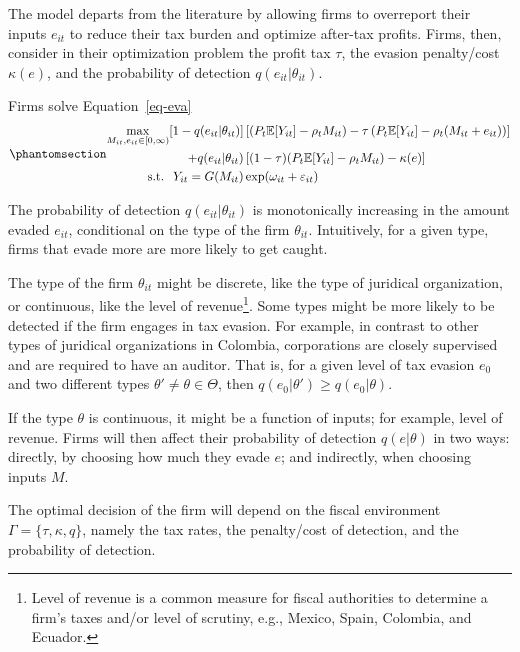 \documentclass[
  12pt]{article}
\theoremstyle{definition}
\theoremstyle{remark}
\begin{document}
The model departs from the literature by allowing firms to overreport
their inputs \(e_{it}\) to reduce their tax burden and optimize
after-tax profits. Firms, then, consider in their optimization problem
the profit tax \(\tau\), the evasion penalty/cost \(\kappa(e)\), and the
probability of detection \(q(e_{it}|\theta_{it})\).

Firms solve Equation~\ref{eq-eva}
\begin{equation}\phantomsection\label{eq-eva}{
\begin{aligned}
  \max_{M_{it}, e_{it}\in [0,\infty)} [1-q(e_{it}|\theta_{it})]&\left[(P_t\mathbb{E}[Y_{it}]-\rho_{t} M_{it})-\tau\left(P_t\mathbb{E}[Y_{it}]-\rho_{t} (M_{it}+e_{it})\right)\right]\\
  +q(e_{it}|\theta_{it})&\left[(1-\tau)(P_t\mathbb{E}[Y_{it}]-\rho_{t} M_{it})-\kappa(e)\right] \\
  \text{s.t. }\; Y_{it}=G(M_{it})&\exp(\omega_{it}+\varepsilon_{it})
\end{aligned}
}\end{equation}

The probability of detection \(q(e_{it}|\theta_{it})\) is monotonically
increasing in the amount evaded \(e_{it}\), conditional on the type of
the firm \(\theta_{it}\). Intuitively, for a given type, firms that
evade more are more likely to get caught.

The type of the firm \(\theta_{it}\) might be discrete, like the type of
juridical organization, or continuous, like the level of
revenue\footnote{Level of revenue is a common measure for fiscal
  authorities to determine a firm's taxes and/or level of scrutiny,
  e.g., Mexico, Spain, Colombia, and Ecuador. }. Some
types might be more likely to be detected if the firm engages in tax
evasion. For example, in contrast to other types of juridical
organizations in Colombia, corporations are closely supervised and are
required to have an auditor. That is, for a given level of tax evasion
\(e_0\) and two different types
\(\theta' \not= \theta \in \mathbfcal{\Theta}\), then
\(q(e_0|\theta')\ge q(e_0|\theta)\).

If the type \(\theta\) is continuous, it might be a function of inputs;
for example, level of revenue. Firms will then affect their probability
of detection \(q(e|\theta)\) in two ways: directly, by choosing how much
they evade \(e\); and indirectly, when choosing inputs \(M\).

The optimal decision of the firm will depend on the fiscal environment
\(\Gamma=\{\tau, \kappa, q \}\), namely the tax rates, the penalty/cost
of detection, and the probability of detection.
\end{document}

